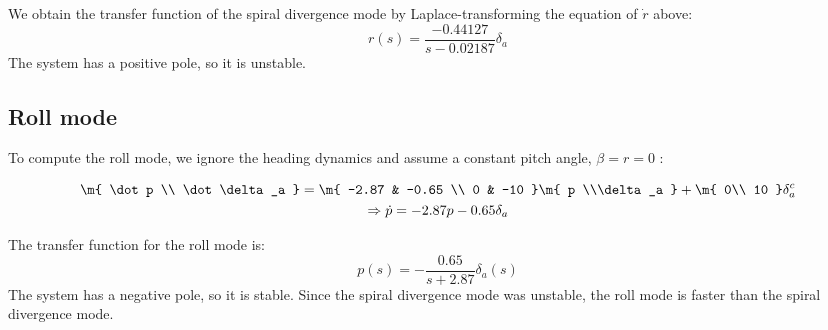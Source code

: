 We obtain the transfer function of the spiral divergence mode by Laplace-transforming the equation of $\dot r$ above:
\begin{equation*}
    r(s) = \frac{-0.44127}{s -0.02187} \delta_a
\end{equation*}
The system has a positive pole, so it is unstable.





\subsection{Roll mode}
To compute the roll mode, we ignore the heading dynamics and assume a constant pitch angle, $\beta = r = 0$ \cite{beard}:
\begin{equations}
    \begin{gather*}
        \m{
            \dot p \\ \dot\delta_a
        }
        =
        \m{
            -2.87   &   -0.65   \\
            0       &   -10     
        } 
        \m{
            p \\\delta_a
        }
        +
        \m{
        0\\ 10
        }
        \delta_a^c\\
        \Rightarrow \dot p = -2.87 p - 0.65 \delta_a
    \end{gather*}
\end{equations}

The transfer function for the roll mode is:
\begin{equation} \label{roll_mode}
    p(s) = -\frac{0.65}{s+2.87} \delta_a(s)
\end{equation}
The system has a negative pole, so it is stable. Since the spiral divergence mode was unstable, the roll mode is faster than the spiral divergence mode.